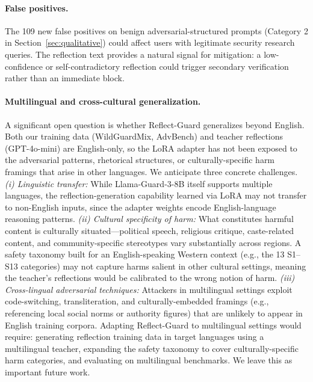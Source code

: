 \documentclass[Superintelligence,article,submit,pdftex,moreauthors]{Definitions/mdpi}
\begin{document}
\paragraph{False positives.}
The 109 new false positives on benign adversarial-structured prompts (Category 2 in Section~\ref{sec:qualitative}) could affect users with legitimate security research queries. The reflection text provides a natural signal for mitigation: a low-confidence or self-contradictory reflection could trigger secondary verification rather than an immediate block.

\paragraph{Multilingual and cross-cultural generalization.}
A significant open question is whether Reflect-Guard generalizes beyond English. Both our training data (WildGuardMix, AdvBench) and teacher reflections (GPT-4o-mini) are English-only, so the LoRA adapter has not been exposed to the adversarial patterns, rhetorical structures, or culturally-specific harm framings that arise in other languages. We anticipate three concrete challenges. \emph{(i) Linguistic transfer:} While Llama-Guard-3-8B itself supports multiple languages, the reflection-generation capability learned via LoRA may not transfer to non-English inputs, since the adapter weights encode English-language reasoning patterns. \emph{(ii) Cultural specificity of harm:} What constitutes harmful content is culturally situated---political speech, religious critique, caste-related content, and community-specific stereotypes vary substantially across regions. A safety taxonomy built for an English-speaking Western context (e.g., the 13 S1--S13 categories) may not capture harms salient in other cultural settings, meaning the teacher's reflections would be calibrated to the wrong notion of harm. \emph{(iii) Cross-lingual adversarial techniques:} Attackers in multilingual settings exploit code-switching, transliteration, and culturally-embedded framings (e.g., referencing local social norms or authority figures) that are unlikely to appear in English training corpora. Adapting Reflect-Guard to multilingual settings would require: generating reflection training data in target languages using a multilingual teacher, expanding the safety taxonomy to cover culturally-specific harm categories, and evaluating on multilingual benchmarks. We leave this as important future work.

\end{document}
